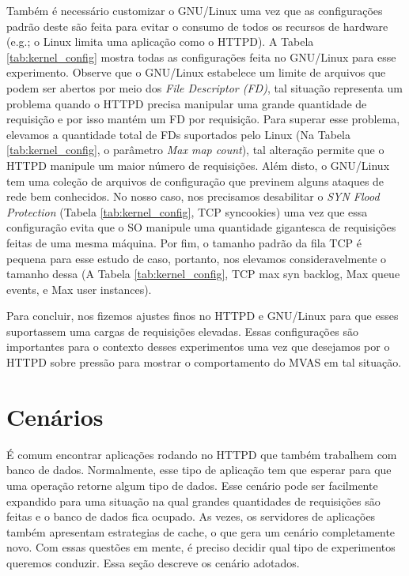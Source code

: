 Também é necessário customizar o GNU/Linux uma vez que as configurações padrão
deste são feita para evitar o consumo de todos os recursos de hardware (e.g.; o
Linux limita uma aplicação como o HTTPD). A Tabela \ref{tab:kernel_config}
mostra todas as configurações feita no GNU/Linux para esse experimento.
Observe que o GNU/Linux estabelece um limite de arquivos que podem ser abertos
por meio dos \emph{File Descriptor (FD)}, tal situação representa um problema
quando o HTTPD precisa manipular uma grande quantidade de requisição e por isso
mantém um FD por requisição. Para superar esse problema, elevamos a quantidade
total de FDs suportados pelo Linux (Na Tabela \ref{tab:kernel_config}, o
parâmetro \emph{Max map count}), tal alteração permite que o HTTPD manipule um
maior número de requisições. Além disto, o GNU/Linux tem uma coleção de
arquivos de configuração que previnem alguns ataques de rede bem conhecidos. No
nosso caso, nos precisamos desabilitar o \emph{SYN Flood Protection} (Tabela
\ref{tab:kernel_config}, TCP syncookies) uma vez que essa configuração evita
que o SO manipule uma quantidade gigantesca de requisições feitas de uma mesma
máquina. Por fim, o tamanho padrão da fila TCP é pequena para esse estudo de
caso, portanto, nos elevamos consideravelmente o tamanho dessa (A Tabela
\ref{tab:kernel_config}, TCP max syn backlog, Max queue events, e Max user
instances).

Para concluir, nos fizemos ajustes finos no HTTPD e GNU/Linux para que esses
suportassem uma cargas de requisições elevadas. Essas configurações são
importantes para o contexto desses experimentos uma vez que desejamos por o
HTTPD sobre pressão para mostrar o comportamento do MVAS em tal situação.

\section{Cenários}

É comum encontrar aplicações rodando no HTTPD que também trabalhem com banco de
dados. Normalmente, esse tipo de aplicação tem que esperar para que uma
operação retorne algum tipo de dados. Esse cenário pode ser facilmente
expandido para uma situação na qual grandes quantidades de requisições são
feitas e o banco de dados fica ocupado. As vezes, os servidores de aplicações
também apresentam estrategias de cache, o que gera um cenário completamente
novo. Com essas questões em mente, é preciso decidir qual tipo de experimentos
queremos conduzir. Essa seção descreve os cenário adotados.

